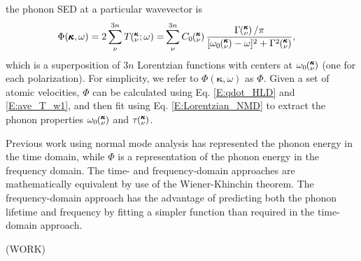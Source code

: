 the phonon SED at a particular wavevector is
\begin{equation}\label{E:Lorentzian_NMD}
\begin{split}
\Phi(\pmb{\kappa},\omega) = 2\sum_{\nu}^{3n} T\kvw =& \sum_{\nu}^{3n}
C_0\kv\frac{\Gamma\kv/\pi}{[\omega_0\kv-\omega]^2+\Gamma^2\kv},
\end{split}
\end{equation}
which is a superposition of $3n$ Lorentzian functions with centers at 
$\omega_0\mspace{-4.0mu}\left(\mspace{-8.0mu} \begin{smallmatrix}&\pmb{\kappa} \\&\nu \end{smallmatrix}\mspace{-3.0mu}\right)$ (one for each polarization). For simplicity, we refer to 
$\Phi(\pmb{\kappa},\omega)$ as $\Phi$. Given a set of atomic velocities,
$\Phi$ can be calculated using Eq$.$ \eqref{E:qdot_HLD} and 
\eqref{E:ave_T_w1}, and then fit using Eq$.$ \eqref{E:Lorentzian_NMD} 
to extract the phonon properties $\omega_0\mspace{-4.0mu}\left(\mspace{-8.0mu} \begin{smallmatrix}&\pmb{\kappa} \\&\nu \end{smallmatrix}\mspace{-3.0mu}\right)$ and $\tau\mspace{-4.0mu}\left(\mspace{-8.0mu} \begin{smallmatrix}&\pmb{\kappa} \\&\nu \end{smallmatrix}\mspace{-3.0mu}\right)$.

Previous work using normal mode analysis has represented the phonon 
energy in the time domain,
\cite{ladd_lattice_1986,mcgaughey_quantitative_2004,
henry_spectral_2008,
turney_predicting_2009,goicochea_thermal_2010,he_thermal_2011} 
while $\Phi$ is a representation 
of the phonon energy in the frequency domain. The time- and 
frequency-domain approaches are mathematically equivalent by use 
of the Wiener-Khinchin theorem.
\cite{rudin_real_1987,shiomi_thermal_2011} The 
frequency-domain approach has the advantage of predicting both the 
phonon lifetime and frequency by fitting a simpler function than 
required in the time-domain approach.












(WORK)












